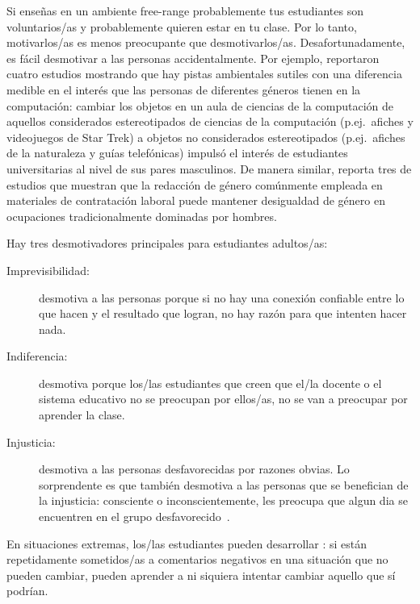 Si enseñas en un ambiente free-range
probablemente tus estudiantes son voluntarios/as
y probablemente quieren estar en tu clase.
Por lo tanto, motivarlos/as es menos preocupante que desmotivarlos/as.
Desafortunadamente,
es fácil desmotivar a las personas accidentalmente.
Por ejemplo,
\cite{Cher2009} reportaron cuatro estudios mostrando que
hay pistas ambientales sutiles con una diferencia medible en el interés que las personas de diferentes géneros tienen en la computación:
cambiar los objetos en un aula de ciencias de la computación de aquellos considerados estereotipados de ciencias de la computación
(p.ej.\ afiches y videojuegos de Star Trek)
a objetos no considerados estereotipados (p.ej.\ afiches de la naturaleza y guías telefónicas)
impulsó el interés de estudiantes universitarias al nivel de sus pares masculinos.
De manera similar,
\cite{Gauc2011} reporta tres de estudios que muestran que
la redacción de género comúnmente empleada en materiales de contratación laboral 
puede mantener desigualdad de género en ocupaciones tradicionalmente dominadas por hombres.

Hay tres desmotivadores principales para estudiantes adultos/as:

\begin{description}

\item[Imprevisibilidad:]
  desmotiva a las personas porque
  si no hay una conexión confiable entre lo que hacen y el resultado que logran,
  no hay razón para que intenten hacer nada.


\item[Indiferencia:]
  desmotiva porque
  los/las estudiantes que creen que el/la docente o el sistema educativo no se preocupan por ellos/as,
  no se van a preocupar por aprender la clase.

\item[Injusticia:]
  desmotiva a las personas desfavorecidas por razones obvias.
  Lo sorprendente es que también desmotiva a las personas que se benefician de la injusticia:
  consciente o inconscientemente,
  les preocupa que
  algun dia se encuentren en el grupo desfavorecido~\cite{Wilk2011}.

\end{description}

En situaciones extremas,
los/las estudiantes pueden desarrollar :
si están repetidamente sometidos/as a comentarios negativos en una situación que no pueden cambiar,
pueden aprender a ni siquiera intentar cambiar aquello que sí podrían.

